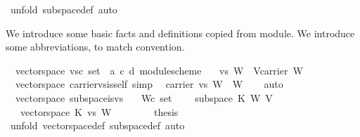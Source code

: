 \begin{isabellebody}
%
\isadelimproof
%
\endisadelimproof
%
\isatagproof
{}\isamarkupfalse%
\ {\isacharparenleft}unfold\ subspace{\isacharunderscore}def{\isacharcomma}\ auto{\isacharparenright}%
\endisatagproof
{\isafoldproof}%
%
\isadelimproof
%
\endisadelimproof
%
\begin{isamarkuptext}%
We introduce some basic facts and definitions copied from module.
We introduce some abbreviations, to match convention.%
\end{isamarkuptext}%
\isamarkuptrue%
\isamarkupfalse%
\ {\isacharparenleft}\ vectorspace{\isacharparenright}\ vs{\isacharcolon}{\isacharcolon}{\isachardoublequoteopen}{\isacharprime}c\ set\ {\isasymRightarrow}\ {\isacharparenleft}{\isacharprime}a{\isacharcomma}\ {\isacharprime}c{\isacharcomma}\ {\isacharprime}d{\isacharparenright}\ module{\isacharunderscore}scheme{\isachardoublequoteclose}\isanewline
\ \ \ {\isachardoublequoteopen}vs\ W\ {\isasymequiv}\ V{\isasymlparr}carrier\ {\isacharcolon}{\isacharequal}W{\isasymrparr}{\isachardoublequoteclose}\isanewline
\isanewline
{}\isamarkupfalse%
\ {\isacharparenleft}\ vectorspace{\isacharparenright}\ carrier{\isacharunderscore}vs{\isacharunderscore}is{\isacharunderscore}self\ {\isacharbrackleft}simp{\isacharbrackright}{\isacharcolon}\isanewline
\ \ {\isachardoublequoteopen}carrier\ {\isacharparenleft}vs\ W{\isacharparenright}\ {\isacharequal}\ W{\isachardoublequoteclose}\isanewline
%
\isadelimproof
\ \ %
\endisadelimproof
%
\isatagproof
{}\isamarkupfalse%
\ auto%
\endisatagproof
{\isafoldproof}%
%
\isadelimproof
\isanewline
%
\endisadelimproof
\isanewline
{}\isamarkupfalse%
\ {\isacharparenleft}\ vectorspace{\isacharparenright}\ subspace{\isacharunderscore}is{\isacharunderscore}vs{\isacharcolon}\isanewline
\ \ \ W{\isacharcolon}{\isacharcolon}{\isachardoublequoteopen}{\isacharprime}c\ set{\isachardoublequoteclose}\isanewline
\ \ \ {}{\isacharcolon}\ {\isachardoublequoteopen}subspace\ K\ W\ V{\isachardoublequoteclose}\isanewline
\ \ \ {\isachardoublequoteopen}vectorspace\ K\ {\isacharparenleft}vs\ W{\isacharparenright}{\isachardoublequoteclose}\isanewline
%
\isadelimproof
%
\endisadelimproof
%
\isatagproof
{}\isamarkupfalse%
\ {\isacharminus}\isanewline
\ \ \isamarkupfalse%
\ {}\ \isamarkupfalse%
\ {\isacharquery}thesis\isanewline
\ \ \ \ \isamarkupfalse%
\ {\isacharparenleft}unfold\ vectorspace{\isacharunderscore}def\ subspace{\isacharunderscore}def{\isacharcomma}\ auto{\isacharparenright}\isanewline

\end{isabellebody}
